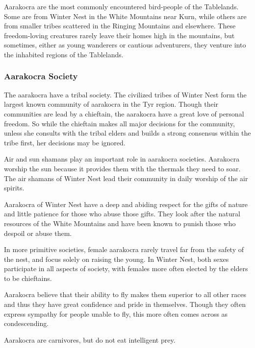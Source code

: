 Aarakocra are the most commonly encountered bird-people of the Tablelands. Some are from Winter Nest in the White Mountains near Kurn, while others are from smaller tribes scattered in the Ringing Mountains and elsewhere. These freedom-loving creatures rarely leave their homes high in the mountains, but sometimes, either as young wanderers or cautious adventurers, they venture into the inhabited regions of the Tablelands.

\subsubsection{Aarakocra Society}
The aarakocra have a tribal society. The civilized tribes of Winter Nest form the largest known community of aarakocra in the Tyr region. Though their communities are lead by a chieftain, the aarakocra have a great love of personal freedom. So while the chieftain makes all major decisions for the community, unless she consults with the tribal elders and builds a strong consensus within the tribe first, her decisions may be ignored.

Air and sun shamans play an important role in aarakocra societies. Aarakocra worship the sun because it provides them with the thermals they need to soar. The air shamans of Winter Nest lead their community in daily worship of the air spirits.

Aarakocra of Winter Nest have a deep and abiding respect for the gifts of nature and little patience for those who abuse those gifts. They look after the natural resources of the White Mountains and have been known to punish those who despoil or abuse them.

In more primitive societies, female aarakocra rarely travel far from the safety of the nest, and focus solely on raising the young. In Winter Nest, both sexes participate in all aspects of society, with females more often elected by the elders to be chieftains.

Aarakocra believe that their ability to fly makes them superior to all other races and thus they have great confidence and pride in themselves. Though they often express sympathy for people unable to fly, this more often comes across as condescending.

Aarakocra are carnivores, but do not eat intelligent prey.


